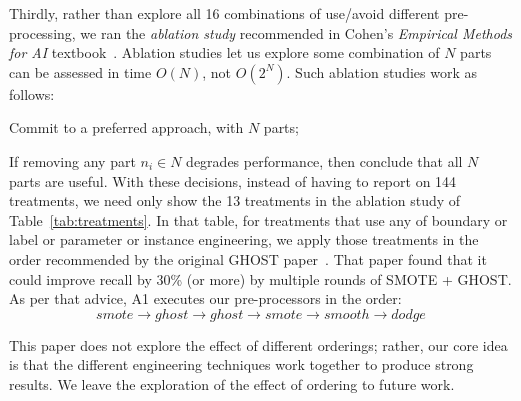  Thirdly, 
  rather than explore all 16 combinations of use/avoid
  different pre-processing, we  ran the {\em ablation study}
  recommended in Cohen's
  {\em Empirical
     Methods for AI} textbook~\cite{cohen1995empirical}.
    Ablation studies let us explore some combination of
     $N$ parts can be assessed in time $O(N)$, not $O(2^N)$.
     Such   ablation studies work as follows:
     \bi
     \item Commit to a preferred approach, with $N$ parts;
     \item If removing any  part $n_i\in N$ degrades performance, then conclude that  all  $N$ parts are useful.
     \ei
 With these decisions, 
 instead of having to report on 144 treatments,
 we need only show the 13 treatments in the  ablation study of
Table~\ref{tab:treatments}.
In that table,
for treatments that use any of boundary  
or label or parameter or instance engineering,
we apply those treatments in the  order  recommended by  the original  GHOST paper~\cite{yedida2021value}. That paper
 found  that it could improve  recall by 30\% (or more) by multiple rounds of SMOTE + GHOST. As per that advice,
 A1  executes our pre-processors in the  order:
   \[ \mathit{smote} \rightarrow  \mathit{ghost} \rightarrow \mathit{ghost} \rightarrow \mathit{smote} \rightarrow \mathit{smooth} \rightarrow  \mathit{dodge}\]
  
This paper does not explore the effect of different orderings; rather, our core idea is that the different engineering techniques work together to produce strong results. We leave the exploration of the effect of ordering to future work. 
  
